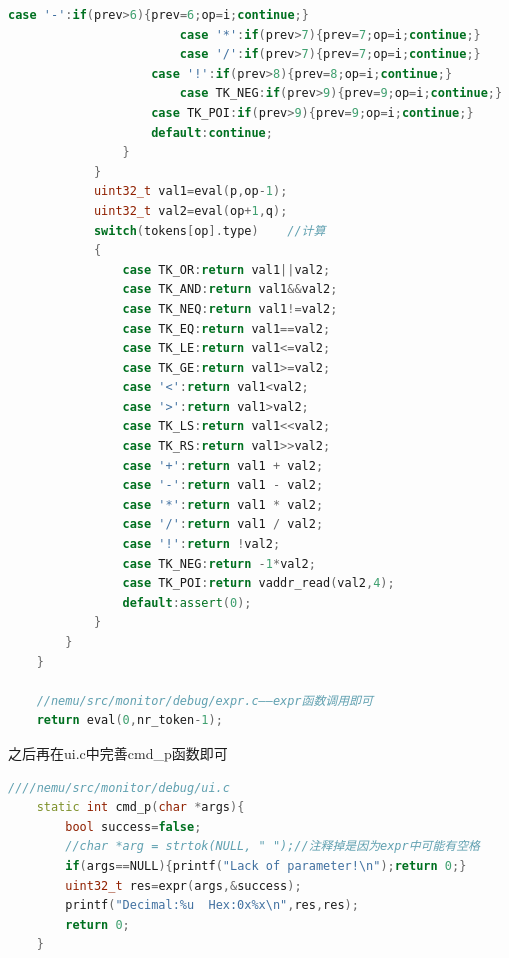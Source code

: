 \documentclass[UTF8,a4paper,10pt]{ctexart}
\begin{document}
{\begin{lstlisting}[title=主运算符获取及计算,frame=trbl,language={C++}]
                        case '-':if(prev>6){prev=6;op=i;continue;}
                        case '*':if(prev>7){prev=7;op=i;continue;}
                        case '/':if(prev>7){prev=7;op=i;continue;}
	                case '!':if(prev>8){prev=8;op=i;continue;}
                        case TK_NEG:if(prev>9){prev=9;op=i;continue;}
	                case TK_POI:if(prev>9){prev=9;op=i;continue;}
	                default:continue;
                }
            }
            uint32_t val1=eval(p,op-1);
            uint32_t val2=eval(op+1,q);
            switch(tokens[op].type)    //计算
            {
                case TK_OR:return val1||val2;
                case TK_AND:return val1&&val2;
                case TK_NEQ:return val1!=val2;
                case TK_EQ:return val1==val2;
                case TK_LE:return val1<=val2;
                case TK_GE:return val1>=val2;
                case '<':return val1<val2;
                case '>':return val1>val2;
                case TK_LS:return val1<<val2;
                case TK_RS:return val1>>val2;
                case '+':return val1 + val2;
                case '-':return val1 - val2;
                case '*':return val1 * val2;
                case '/':return val1 / val2;
                case '!':return !val2;
                case TK_NEG:return -1*val2;
                case TK_POI:return vaddr_read(val2,4);
                default:assert(0);
            }
        }
    }

    //nemu/src/monitor/debug/expr.c——expr函数调用即可
    return eval(0,nr_token-1);
    \end{lstlisting}

    之后再在ui.c中完善cmd\_p函数即可
    \begin{lstlisting}[title=表达式计算,frame=trbl,language={C++}]
    ////nemu/src/monitor/debug/ui.c
    static int cmd_p(char *args){
        bool success=false;
        //char *arg = strtok(NULL, " ");//注释掉是因为expr中可能有空格
        if(args==NULL){printf("Lack of parameter!\n");return 0;}
        uint32_t res=expr(args,&success);
        printf("Decimal:%u  Hex:0x%x\n",res,res);
        return 0;
    }
    \end{lstlisting}
}
\end{document}
